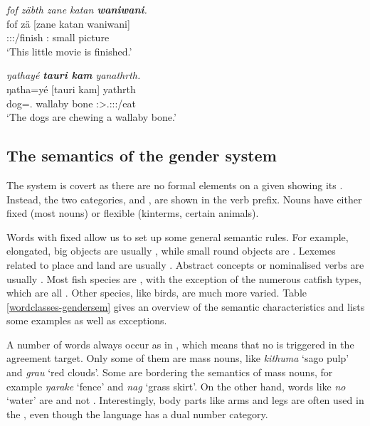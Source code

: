 \begin{exe}
	\ex \emph{fof zäbth zane katan \textbf{waniwani}.}\\
	\gll fof zä [zane katan waniwani]\\
	\Emph{} \Stsg:\Sbj:\Rpst:\Pfv/finish \Dem:\Prox{} small {picture}\\
	\trans `This little movie is finished.'
	\label{ex046}
\end{exe}
\begin{exe}
	\ex \emph{ŋathayé \textbf{tauri kam} yanathrth.}\\
	\gll ŋatha=yé [tauri kam] yathrth\\
	dog=\Erg.\Nsg{} wallaby bone \Stpl:\Sbj>\Tsg.\Masc:\Obj:\Nonpast:\Ipfv/eat\\
	\trans `The dogs are chewing a wallaby bone.'
	\label{ex047}
\end{exe}

\subsection{The semantics of the gender system}\label{wordclasses-thegendersystem}

The  system is covert as there are no formal elements on a given  showing its . Instead, the two categories,  and , are shown in the verb prefix. Nouns have either fixed  (most nouns) or flexible  (kinterms, certain animals).%

Words with fixed  allow us to set up some general semantic rules. For example, elongated, big objects are usually , while small round objects are . Lexemes related to place and land are usually . Abstract concepts or nominalised verbs are usually . Most fish species are , with the exception of the numerous catfish types, which are all . Other species, like birds, are much more varied. Table \ref{wordclasses-gendersem} gives an overview of the semantic characteristics and lists some examples as well as exceptions.%

A number of words always occur as in , which means that no  is triggered in the agreement target. Only some of them are mass nouns, like \emph{kithuma} `sago pulp' and \emph{grau} `red clouds'. Some are bordering the semantics of mass nouns, for example \emph{ŋarake} `fence' and \emph{nag} `grass skirt'. On the other hand, words like \emph{no} `water' are  and not . Interestingly, body parts like arms and legs are often used in the , even though the language has a dual number category.%

